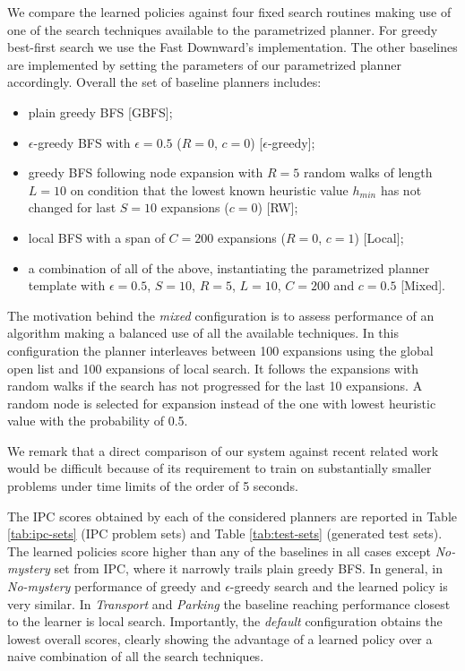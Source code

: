 \documentclass[letterpaper]{article} %
\begin{document}
We compare the learned policies against four fixed search routines making use of one of the search techniques available to the parametrized planner. For greedy best-first search we use the Fast Downward's implementation. The other baselines are implemented by setting the parameters of our parametrized planner accordingly. Overall the set of baseline planners includes:
\begin{itemize}
    \item plain greedy BFS [GBFS];
    \item $\epsilon$-greedy BFS with $\epsilon=0.5$ ($R=0$, $c=0$) [$\epsilon$-greedy];
    \item greedy BFS following node expansion with $R=5$ random walks of length $L=10$ on condition that the lowest known heuristic value $h_{min}$ has not changed for last $S=10$ expansions ($c=0$) [RW];
    \item local BFS with a span of $C=200$ expansions ($R=0$, $c=1$) [Local];
    \item a combination of all of the above, instantiating the parametrized planner template with $\epsilon=0.5$, $S=10$, $R=5$, $L=10$, $C=200$ and $c=0.5$ [Mixed].
\end{itemize}

The motivation behind the \emph{mixed} configuration is to assess performance of an algorithm making a balanced use of all the available techniques. In this configuration the planner interleaves between 100 expansions using the global open list and 100 expansions of local search. It follows the expansions with random walks if the search has not progressed for the last 10 expansions. A random node is selected for expansion instead of the one with lowest heuristic value with the probability of 0.5.

We remark that a direct comparison of our system against recent related work \cite{Gomoluch2019} would be difficult because of its requirement to train on substantially smaller problems under time limits of the order of 5 seconds.

The IPC scores obtained by each of the considered planners are reported in Table \ref{tab:ipc-sets} (IPC problem sets) and Table \ref{tab:test-sets} (generated test sets). The learned policies score higher than any of the baselines in all cases except \emph{No-mystery} set from IPC, where it narrowly trails plain greedy BFS. In general, in \emph{No-mystery} performance of greedy and $\epsilon$-greedy search and the learned policy is very similar. In \emph{Transport} and \emph{Parking} the baseline reaching performance closest to the learner is local search.
Importantly, the \emph{default} configuration obtains the lowest overall scores, clearly showing the advantage of a learned policy over a naive combination of all the search techniques.
\end{document}
